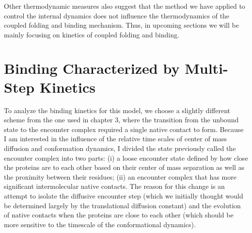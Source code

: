 \documentclass[../talant.diss.submit.tex]{subfiles}
\begin{document}
Other thermodynamic measures also suggest that the method we have applied to control the internal
dynamics does not influence the thermodynamics of the coupled folding and binding mechanism.
Thus, in upcoming sections we will be mainly focusing on kinetics of coupled folding and binding.

      
%
\section{\textbf{Binding Characterized by Multi-Step Kinetics}\label{sect:multi_step_binding_kinetics}}


To analyze the binding kinetics for this model, we choose a slightly different scheme
from the one used in chapter 3, where the transition from the unbound state to the encounter
complex required a single native contact to form.
Because I am interested in the influence of the relative
time scales of center of mass diffusion and conformation dynamics, I divided the state
previously called the encounter complex into two parts: (i) a loose encounter state defined by
how close the proteins are to each other based on their center of mass separation as well as the 
proximity between their residues; (ii) an encounter complex that has more significant intermolecular
native contacts. The reason for this change is an attempt to isolate the diffusive encounter
step (which we initially thought would be determined largely by the translational diffusion constant)
and the evolution of native contacts when the proteins are close to each other (which should be
more sensitive to the timescale of the conformational dynamics). 
%
%
\end{document}
